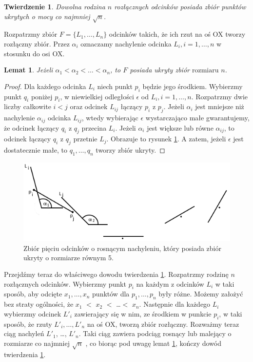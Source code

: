 \documentclass[brudnopis]{xmgr}
\newtheorem{Twierdzenie}{Twierdzenie}
\newtheorem{Lemat}{Lemat}
\theoremstyle{definition}
\begin{document}
\begin{Twierdzenie}\label{moc zbioru ukrytego tw} \cite{illumination}
  Dowolna rodzina $n$ rozłącznych odcinków posiada zbiór punktów ukrytych o mocy co najmniej $\sqrt{n}$.
\end{Twierdzenie}

Rozpatrzmy zbiór $F = \{L_1,\ldots,L_n\}$ odcinków takich, że ich rzut na oś OX tworzy rozłączny zbiór. Przez $\alpha_i$ oznaczamy nachylenie odcinka $L_i, i = 1,\ldots,n$ w stosunku do osi OX.
\begin{Lemat}\label{zbior ukryty} \cite{illumination}
  Jeżeli $\alpha_1 < \alpha_2 < \ldots < \alpha_n$, to $F$ posiada ukryty zbiór $\mbox{rozmiaru $n$}$.
\end{Lemat}

\begin{proof}
	Dla każdego odcinka $L_i$ niech punkt $p_i$ będzie jego środkiem. Wybierzmy punkt $q_i$ poniżej $p_i$, w niewielkiej odległości $\epsilon$ od $L_i, i = 1,\ldots,n$. Rozpatrzmy dwie liczby całkowite $i < j$ oraz odcinek $L_{ij}$ łączący $p_i$ z $p_j$. Jeżeli $\alpha_i$ jest mniejsze niż nachylenie $\alpha_{ij}$ odcinka $L_{ij}$, wtedy wybierając $\epsilon$ wystarczająco małe gwarantujemy, że odcinek łączący $q_i$ z $q_j$ przecina $L_i$. Jeżeli $\alpha_i$ jest większe lub równe $\alpha_{ij}$, to odcinek łączący $q_i$ z $q_j$ przetnie $L_j$. Obrazuje to rysunek \ref{fig:5 zbior ukryty}. A zatem, jeżeli $\epsilon$ jest dostatecznie małe, to  $q_1, \ldots, q_n$ tworzy zbiór ukryty. 
\end{proof}
\begin{figure}[ht!]
  \centering
   \includegraphics{rysunki/5_odcinkow_zbior_ukryty.png}
   \caption{Zbiór pięciu odcinków o rosnącym nachyleniu, który posiada zbiór ukryty o rozmiarze równym 5.}
   \label{fig:5 zbior ukryty}
\end{figure}
\indent Przejdźmy teraz do właściwego dowodu twierdzenia \ref{moc zbioru ukrytego tw}. Rozpatrzmy rodzinę $n$ rozłącznych odcinków. Wybierzmy punkt $p_i$ na każdym z odcinków $L_i$ w taki sposób, aby odcięte $x_1,\ldots, x_n$ punktów dla $p_1,\ldots,p_n$ były różne. Możemy założyć bez straty ogólności, że $x_1$ $<$ $x_2$ $<$ \ldots $<$ $x_n$. Następnie dla każdego $L_i$ wybierzmy odcinek $L'_i$ zawierający się w nim, ze środkiem w punkcie $p_i$, w taki sposób, że rzuty $L'_i,\ldots,L'_n$ na oś OX, tworzą zbiór rozłączny. Rozważmy teraz ciąg nachyleń $L'_1$, \ldots, $L'_n$. Taki ciąg zawiera podciąg rosnący lub malejący o rozmiarze co najmniej $\sqrt{n}$ \cite{illumination}, co biorąc pod uwagę lemat \ref{zbior ukryty}, kończy dowód twierdzenia \ref{moc zbioru ukrytego tw}.
\end{document}
